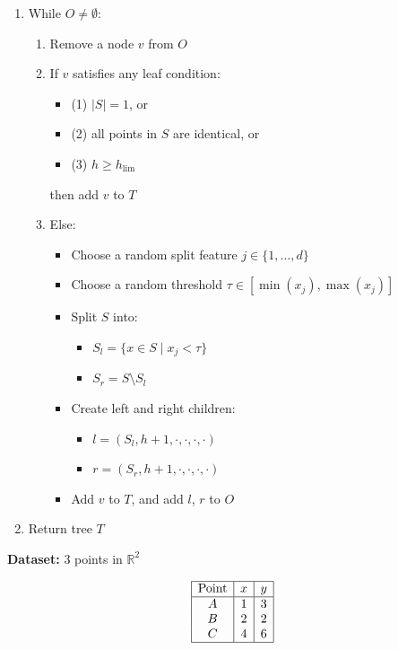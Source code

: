 \documentclass{article}
\begin{document}
\begin{enumerate}
    \item While $O \neq \emptyset$:
    \begin{enumerate}
        \item Remove a node $v$ from $O$
        \item If $v$ satisfies any leaf condition:
        \begin{itemize}
            \item (1) $|S| = 1$, or
            \item (2) all points in $S$ are identical, or
            \item (3) $h \ge h_{\text{lim}}$
        \end{itemize}
        then add $v$ to $T$
        \item Else:
        \begin{itemize}
            \item Choose a random split feature $j \in \{1, \dots, d\}$
            \item Choose a random threshold $\tau \in [\min(x_j), \max(x_j)]$
            \item Split $S$ into:
            \begin{itemize}
                \item $S_l = \{ x \in S \mid x_j < \tau \}$
                \item $S_r = S \setminus S_l$
            \end{itemize}
            \item Create left and right children:
            \begin{itemize}
                \item $l = (S_l, h+1, \cdot, \cdot, \cdot, \cdot)$
                \item $r = (S_r, h+1, \cdot, \cdot, \cdot, \cdot)$
            \end{itemize}
            \item Add $v$ to $T$, and add $l$, $r$ to $O$
        \end{itemize}
    \end{enumerate}

    \item Return tree $T$
\end{enumerate}


\textbf{Dataset:} 3 points in $\mathbb{R}^2$

\[
\begin{array}{|c|c|c|}
\hline
\text{Point} & x & y \\
\hline
A & 1 & 3 \\
B & 2 & 2 \\
C & 4 & 6 \\
\hline
\end{array}
\]
\end{document}
